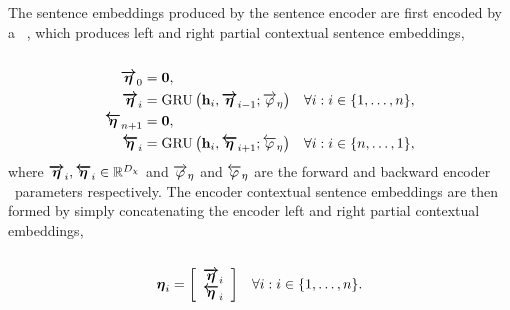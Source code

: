 The sentence embeddings produced by the sentence encoder are first encoded by a
\bidirectional~\gru, which produces left and right partial contextual sentence
embeddings, \\



\\[-40pt]
\begin{align}
        \boldsymbol{\overrightarrow{\eta}}_0  &= \mathbf{0}, \\
\boldsymbol{\overrightarrow{\eta}}_i & = \operatorname{GRU}\left(
            \mathbf{h}_i, \boldsymbol{\overrightarrow{\eta}}_{i-1}; 
            {\overrightarrow{\varphi}_\eta}\right) &
\forall i : i \in \{1,\ldots,n\}, \\
        \boldsymbol{\overleftarrow{\eta}}_{n + 1}  &= \mathbf{0}, \\
\boldsymbol{\overleftarrow{\eta}}_i &= \operatorname{GRU}\left(
            \mathbf{h}_i, \boldsymbol{\overleftarrow{\eta}}_{i+1}; 
            {\overleftarrow{\varphi}_\eta}\right) &
\forall i : i \in \{n,\ldots,1\}, 
\end{align}
where $\boldsymbol{\overrightarrow{\eta}}_i,\boldsymbol{\overleftarrow{\eta}}_i \in \mathbb{R}^{{D_\chi}}$ and
${\overrightarrow{\varphi}_\eta}$ and ${\overleftarrow{\varphi}_\eta}$ are the forward and backward
encoder \gru~parameters respectively. The encoder contextual sentence
embeddings are then formed by simply concatenating the encoder left and right
partial contextual embeddings,\\

\\[-20pt]
\begin{align}
        \boldsymbol{\eta}_i & = \left[\begin{array}{c}
            \boldsymbol{\overrightarrow{\eta}}_i\\ 
            \boldsymbol{\overleftarrow{\eta}}_i\end{array}\right]  &
\forall i :  i \in \{1,\ldots,n\}.
\end{align}




